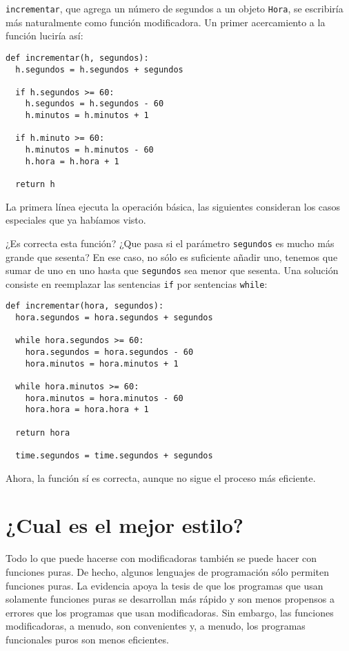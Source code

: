 \texttt{incrementar}, que agrega un número de segundos a un objeto
\texttt{Hora}, se escribiría más naturalmente como función modificadora.
Un primer acercamiento a la función luciría así:
\begin{lstlisting}
def incrementar(h, segundos):
  h.segundos = h.segundos + segundos

  if h.segundos >= 60:
    h.segundos = h.segundos - 60
    h.minutos = h.minutos + 1

  if h.minuto >= 60:
    h.minutos = h.minutos - 60
    h.hora = h.hora + 1

  return h
\end{lstlisting}

La primera línea ejecuta la operación básica, las siguientes consideran
los casos especiales que ya habíamos visto.

¿Es correcta esta función? ¿Que pasa si el parámetro \texttt{segundos}
es mucho más grande que sesenta? En ese caso, no sólo es suficiente
añadir uno, tenemos que sumar de uno en uno hasta que \texttt{segundos}
sea menor que sesenta. Una solución consiste en reemplazar las sentencias
\texttt{if} por sentencias \texttt{while}:
\begin{lstlisting}
def incrementar(hora, segundos):
  hora.segundos = hora.segundos + segundos

  while hora.segundos >= 60:
    hora.segundos = hora.segundos - 60
    hora.minutos = hora.minutos + 1

  while hora.minutos >= 60:
    hora.minutos = hora.minutos - 60
    hora.hora = hora.hora + 1

  return hora

  time.segundos = time.segundos + segundos
\end{lstlisting}

Ahora, la función sí es correcta, aunque no sigue el proceso más eficiente.

\section{¿Cual es el mejor estilo?}


Todo lo que puede hacerse con modificadoras también se puede hacer
con funciones puras. De hecho, algunos lenguajes de programación sólo
permiten funciones puras. La evidencia apoya la tesis de que los programas
que usan solamente funciones puras se desarrollan más rápido y son
menos propensos a errores que los programas que usan modificadoras.
Sin embargo, las funciones modificadoras, a menudo, son convenientes
y, a menudo, los programas funcionales puros son menos eficientes.

